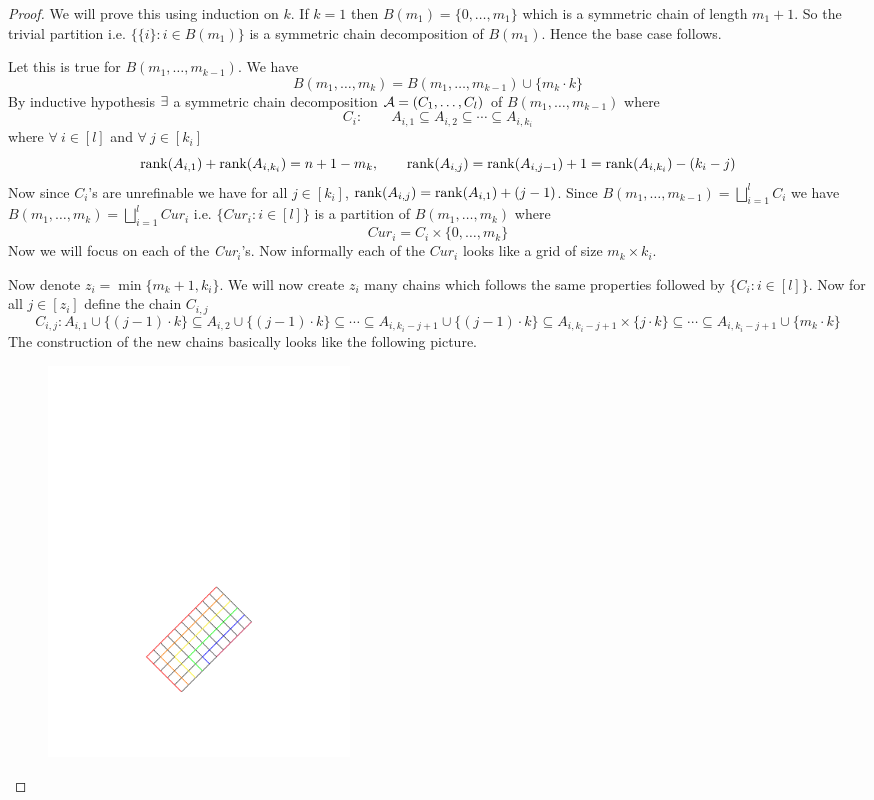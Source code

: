 \documentclass[twoside]{article}
\begin{document}
\begin{proof}
	We will prove this using induction on $k$. If $k=1$ then $B(m_1)=\{0,\dots, m_1\}$ which is a symmetric chain of length $m_1+1$. So the trivial partition i.e. $\{\{i\}\colon i\in B(m_1)\}$ is a symmetric chain decomposition of $B(m_1)$. Hence the base case follows.
	
	Let this is true for $B(m_1,\dots, m_{k-1})$. We have $$B(m_1,\dots, m_{k})=B(m_1,\dots, m_{k-1})\cup\{m_k\cdot k\}$$  By inductive hypothesis $\exists$ a symmetric chain decomposition $\mathcal{A}=(C_1,\dots,C_l)$ of $B(m_1,\dots, m_{k-1})$ where $$C_i:\qquad A_{i,1}\subseteq A_{i,2}\subseteq \cdots\subseteq  A_{i,k_i}$$where $\forall\ i\in[l]$ and $\forall\ j\in[k_i]$ $$\operatorname{rank}(A_{i,1})+\operatorname{rank}(A_{i,k_i})=n+1-m_k,\qquad \operatorname{rank}(A_{i,j})=\operatorname{rank}(A_{i,j-1})+1=\operatorname{rank}(A_{i,k_i})-(k_i-j)$$Now since $C_i$'s are unrefinable we have for all $j\in[k_i]$, $\operatorname{rank}(A_{i,j})=\operatorname{rank}(A_{i,1})+(j-1)$. Since $B(m_1,\dots,m_{k-1})=\bigsqcup\limits_{i=1}^{l}C_i$ we have $B(m_1,\dots, m_k)=\bigsqcup\limits_{i=1}^l\textit{Cur}_i$ i.e. $\{\textit{Cur}_i\colon i\in[l]\}$ is a partition of $B(m_1,\dots,m_k)$ where 
	$$\textit{Cur}_i=C_i\times \{0,\dots, m_k\}$$Now we will focus on each of the \textit{Cur}$_i$'s. Now informally each of the $\textit{Cur}_i$ looks like a grid of size $m_k\times k_i$. 
	
	Now denote $z_i=\min\{m_k+1,k_i\}$. We will now create $z_i$ many chains which follows the same properties followed by $\{C_i\colon i\in[l]\}$. Now for all $j\in [z_i]$ define the chain $C_{i,j}$ 
	$$C_{i,j}\colon  A_{i,1}\cup\{(j-1)\cdot k\}\subseteq  A_{i,2}\cup\{(j-1)\cdot k\}\subseteq  \cdots\subseteq  A_{i,k_i-j+1}\cup\{(j-1)\cdot k\}\subseteq   A_{i,k_i-j+1}\times\{j\cdot k\}\subseteq  \cdots \subseteq  A_{i,k_i-j+1}\cup\{m_k\cdot k\}$$
	The construction of the new chains basically looks like the following picture.
	\begin{figure}[h]
		\centering
		\includegraphics[width=8cm]{images/symchaindecomp.pdf}
	\end{figure}\parinf
	

\end{proof}
\end{document}
